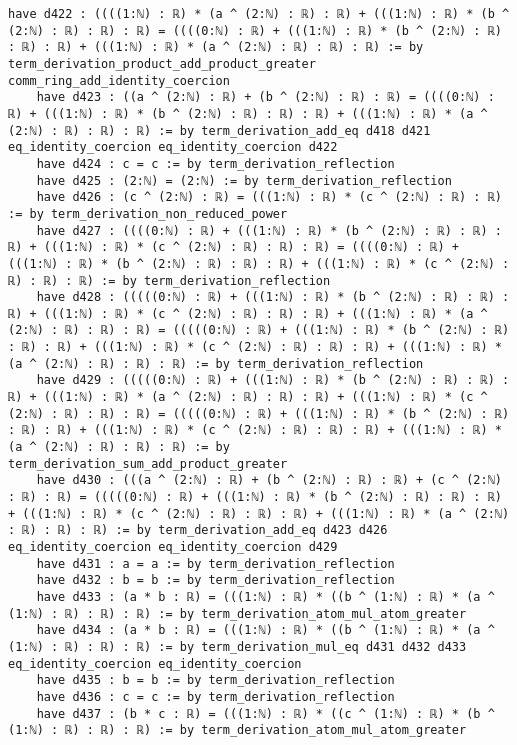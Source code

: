 \documentclass{article}
\begin{document}
\begin{tcolorbox}[colback=white!10, width=\linewidth]
\begin{lstlisting}[language=Lean4]
    have d422 : ((((1:ℕ) : ℝ) * (a ^ (2:ℕ) : ℝ) : ℝ) + (((1:ℕ) : ℝ) * (b ^ (2:ℕ) : ℝ) : ℝ) : ℝ) = ((((0:ℕ) : ℝ) + (((1:ℕ) : ℝ) * (b ^ (2:ℕ) : ℝ) : ℝ) : ℝ) + (((1:ℕ) : ℝ) * (a ^ (2:ℕ) : ℝ) : ℝ) : ℝ) := by term_derivation_product_add_product_greater comm_ring_add_identity_coercion
    have d423 : ((a ^ (2:ℕ) : ℝ) + (b ^ (2:ℕ) : ℝ) : ℝ) = ((((0:ℕ) : ℝ) + (((1:ℕ) : ℝ) * (b ^ (2:ℕ) : ℝ) : ℝ) : ℝ) + (((1:ℕ) : ℝ) * (a ^ (2:ℕ) : ℝ) : ℝ) : ℝ) := by term_derivation_add_eq d418 d421 eq_identity_coercion eq_identity_coercion d422
    have d424 : c = c := by term_derivation_reflection
    have d425 : (2:ℕ) = (2:ℕ) := by term_derivation_reflection
    have d426 : (c ^ (2:ℕ) : ℝ) = (((1:ℕ) : ℝ) * (c ^ (2:ℕ) : ℝ) : ℝ) := by term_derivation_non_reduced_power
    have d427 : ((((0:ℕ) : ℝ) + (((1:ℕ) : ℝ) * (b ^ (2:ℕ) : ℝ) : ℝ) : ℝ) + (((1:ℕ) : ℝ) * (c ^ (2:ℕ) : ℝ) : ℝ) : ℝ) = ((((0:ℕ) : ℝ) + (((1:ℕ) : ℝ) * (b ^ (2:ℕ) : ℝ) : ℝ) : ℝ) + (((1:ℕ) : ℝ) * (c ^ (2:ℕ) : ℝ) : ℝ) : ℝ) := by term_derivation_reflection
    have d428 : (((((0:ℕ) : ℝ) + (((1:ℕ) : ℝ) * (b ^ (2:ℕ) : ℝ) : ℝ) : ℝ) + (((1:ℕ) : ℝ) * (c ^ (2:ℕ) : ℝ) : ℝ) : ℝ) + (((1:ℕ) : ℝ) * (a ^ (2:ℕ) : ℝ) : ℝ) : ℝ) = (((((0:ℕ) : ℝ) + (((1:ℕ) : ℝ) * (b ^ (2:ℕ) : ℝ) : ℝ) : ℝ) + (((1:ℕ) : ℝ) * (c ^ (2:ℕ) : ℝ) : ℝ) : ℝ) + (((1:ℕ) : ℝ) * (a ^ (2:ℕ) : ℝ) : ℝ) : ℝ) := by term_derivation_reflection
    have d429 : (((((0:ℕ) : ℝ) + (((1:ℕ) : ℝ) * (b ^ (2:ℕ) : ℝ) : ℝ) : ℝ) + (((1:ℕ) : ℝ) * (a ^ (2:ℕ) : ℝ) : ℝ) : ℝ) + (((1:ℕ) : ℝ) * (c ^ (2:ℕ) : ℝ) : ℝ) : ℝ) = (((((0:ℕ) : ℝ) + (((1:ℕ) : ℝ) * (b ^ (2:ℕ) : ℝ) : ℝ) : ℝ) + (((1:ℕ) : ℝ) * (c ^ (2:ℕ) : ℝ) : ℝ) : ℝ) + (((1:ℕ) : ℝ) * (a ^ (2:ℕ) : ℝ) : ℝ) : ℝ) := by term_derivation_sum_add_product_greater
    have d430 : (((a ^ (2:ℕ) : ℝ) + (b ^ (2:ℕ) : ℝ) : ℝ) + (c ^ (2:ℕ) : ℝ) : ℝ) = (((((0:ℕ) : ℝ) + (((1:ℕ) : ℝ) * (b ^ (2:ℕ) : ℝ) : ℝ) : ℝ) + (((1:ℕ) : ℝ) * (c ^ (2:ℕ) : ℝ) : ℝ) : ℝ) + (((1:ℕ) : ℝ) * (a ^ (2:ℕ) : ℝ) : ℝ) : ℝ) := by term_derivation_add_eq d423 d426 eq_identity_coercion eq_identity_coercion d429
    have d431 : a = a := by term_derivation_reflection
    have d432 : b = b := by term_derivation_reflection
    have d433 : (a * b : ℝ) = (((1:ℕ) : ℝ) * ((b ^ (1:ℕ) : ℝ) * (a ^ (1:ℕ) : ℝ) : ℝ) : ℝ) := by term_derivation_atom_mul_atom_greater
    have d434 : (a * b : ℝ) = (((1:ℕ) : ℝ) * ((b ^ (1:ℕ) : ℝ) * (a ^ (1:ℕ) : ℝ) : ℝ) : ℝ) := by term_derivation_mul_eq d431 d432 d433 eq_identity_coercion eq_identity_coercion
    have d435 : b = b := by term_derivation_reflection
    have d436 : c = c := by term_derivation_reflection
    have d437 : (b * c : ℝ) = (((1:ℕ) : ℝ) * ((c ^ (1:ℕ) : ℝ) * (b ^ (1:ℕ) : ℝ) : ℝ) : ℝ) := by term_derivation_atom_mul_atom_greater

\end{lstlisting}
\end{tcolorbox}
\end{document}
